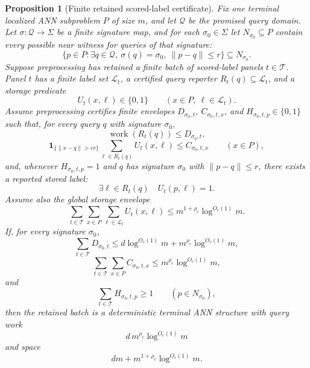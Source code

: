 \documentclass[10pt]{article}
\newtheorem{proposition}[theorem]{Proposition}
\theoremstyle{definition}
\begin{document}
\begin{proposition}[Finite retained scored-label certificate]
   \label{prop:finite-retained-scored-label}
   Fix one terminal localized ANN subproblem \(P\) of size \(m\), and let
   \(\mathcal Q\) be the promised query domain.  Let
   \(\sigma:\mathcal Q\to\Sigma\) be a finite signature map, and for each
   \(\sigma_0\in\Sigma\) let \(N_{\sigma_0}\subseteq P\) contain every
   possible near witness for queries of that signature:
   \[
      \{p\in P:\exists q\in\mathcal Q,\ \sigma(q)=\sigma_0,\ \|p-q\|\le r\}
      \subseteq N_{\sigma_0}.
      \tag{FSL0}
   \]
   Suppose preprocessing has retained a finite batch of scored-label panels
   \(t\in\mathcal T\).  Panel \(t\) has a finite label set
   \(\mathcal L_t\), a certified query reporter
   \(R_t(q)\subseteq\mathcal L_t\), and a storage predicate
   \[
      U_t(x,\ell)\in\{0,1\}
      \qquad(x\in P,\ \ell\in\mathcal L_t).
   \]
   Assume preprocessing certifies finite envelopes \(D_{\sigma_0,t}\),
   \(C_{\sigma_0,t,x}\), and \(H_{\sigma_0,t,p}\in\{0,1\}\) such that, for
   every query \(q\) with signature \(\sigma_0\),
   \[
      \operatorname{work}(R_t(q))\le D_{\sigma_0,t},
      \tag{FSL1}
   \]
   \[
      \mathbf 1_{\{\|x-q\|>cr\}}
      \sum_{\ell\in R_t(q)}U_t(x,\ell)
      \le C_{\sigma_0,t,x}
      \qquad(x\in P),
      \tag{FSL2}
   \]
   and, whenever \(H_{\sigma_0,t,p}=1\) and
   \(q\) has signature \(\sigma_0\) with \(\|p-q\|\le r\), there exists a
   reported stored label:
   \[
      \exists \ell\in R_t(q)\quad U_t(p,\ell)=1.
      \tag{FSL3}
   \]
   Assume also the global storage envelope
   \[
      \sum_{t\in\mathcal T}\sum_{x\in P}\sum_{\ell\in\mathcal L_t}
      U_t(x,\ell)
      \le m^{1+\rho_c}\log^{O_c(1)}m.
      \tag{FSL4}
   \]
   If, for every signature \(\sigma_0\),
   \[
      \sum_{t\in\mathcal T}D_{\sigma_0,t}
      \le d\log^{O_c(1)}m+m^{\rho_c}\log^{O_c(1)}m,
      \tag{FSL5}
   \]
   \[
      \sum_{t\in\mathcal T}\sum_{x\in P}C_{\sigma_0,t,x}
      \le m^{\rho_c}\log^{O_c(1)}m,
      \tag{FSL6}
   \]
   and
   \[
      \sum_{t\in\mathcal T}H_{\sigma_0,t,p}\ge1
      \qquad(p\in N_{\sigma_0}),
      \tag{FSL7}
   \]
   then the retained batch is a deterministic terminal ANN structure with
   query work
   \[
      d\,m^{\rho_c}\log^{O_c(1)}m
   \]
   and space
   \[
      dm+m^{1+\rho_c}\log^{O_c(1)}m .
   \]
\end{proposition}
\end{document}
